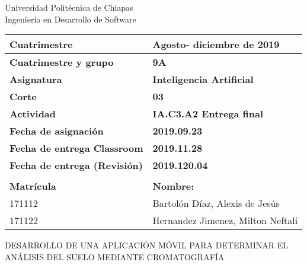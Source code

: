 \begin{center}
{\Large Universidad Politécnica de Chiapas}\\
{\large Ingeniería en Desarrollo de Software}\\
\vspace{1cm}

\end{center}

\resizebox{15cm}{!} {	
\begin{tabular}{|l|l|}
	\hline 
	\textbf{Cuatrimestre} & \textbf{Agosto- diciembre de 2019} \\ 
	\hline 
	\textbf{Cuatrimestre y grupo} & \textbf{9A} \\ 
	\hline 
	\textbf{Asignatura} & \textbf{Inteligencia Artificial} \\ 
	\hline 
	\textbf{Corte} & \textbf{03} \\ 
	\hline 
	\textbf{Actividad} & \textbf{IA.C3.A2 Entrega final} \\ 
	\hline 
	\textbf{Fecha de asignación} & \textbf{2019.09.23} \\ 
	\hline 
	\textbf{Fecha de entrega Classroom} & \textbf{2019.11.28} \\ 
	\hline 
	\textbf{Fecha de entrega (Revisión)} & \textbf{2019.120.04} \\ 
	\hline 
	\multicolumn{2}{|c|}{} \\ 
	\hline 
	\textbf{Matrícula} & \textbf{Nombre:} \\ 
	\hline 
	171112 & Bartolón Díaz, Alexis de Jesús \\ 
	\hline 
	171122 & Hernandez Jimenez, Milton Neftali\\ 
	\hline 	
\end{tabular} 
}
 
\vspace{3cm}

\begin{center}
{\Huge DESARROLLO DE UNA APLICACIÓN MÓVIL PARA DETERMINAR EL ANÁLISIS DEL SUELO MEDIANTE CROMATOGRAFÍA}
\end{center}


